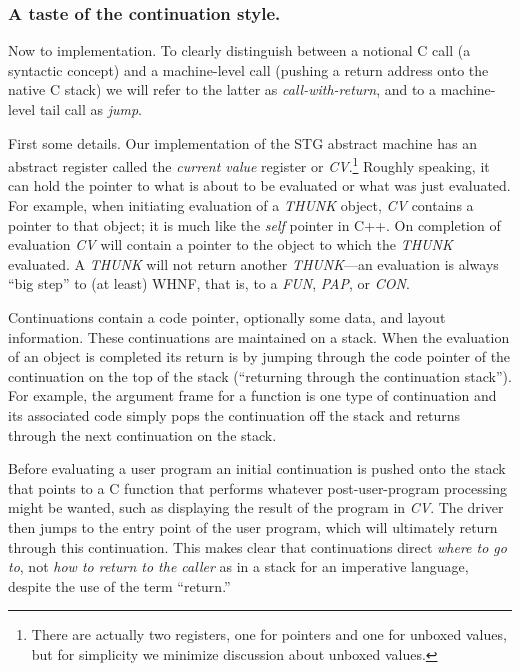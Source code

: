 \documentclass{llncs}
\begin{document}
\subsubsection{A taste of the continuation style.}
Now to implementation.  To clearly distinguish between a notional C call (a
syntactic concept) and a machine-level call (pushing a return address onto the
native C stack) we will refer to the latter as \emph{call-with-return}, and to
a machine-level tail call as \emph{jump}.

First some details.  Our implementation of the STG abstract machine has an
abstract register called the \emph{current value} register or
\emph{CV}.\footnote{There are actually two registers, one for pointers and
  one for unboxed values, but for simplicity we minimize discussion about
  unboxed values.}  Roughly speaking, it can hold the pointer to what is about
to be evaluated or what was just evaluated.  For example, when initiating
evaluation of a \emph{THUNK} object, \emph{CV} contains a pointer to that
object; it is much like the \emph{self} pointer in C++.  On completion of
evaluation \emph{CV} will contain a pointer to the object to which the
\emph{THUNK} evaluated.  A \emph{THUNK} will not return another
\emph{THUNK}---an evaluation is always ``big step'' to (at least) WHNF, that
is, to a \emph{FUN}, \emph{PAP}, or \emph{CON}.

Continuations contain a code pointer, optionally some data, and layout
information.  These continuations are maintained on a stack.  When the
evaluation of an object is completed its return is by jumping through the code
pointer of the continuation on the top of the stack (``returning through the
continuation stack'').  For example, the argument frame for a function is one
type of continuation and its associated code simply pops the continuation off
the stack and returns through the next continuation on the stack.

Before evaluating a user program an initial continuation is pushed onto
the stack that points to a C function that performs whatever post-user-program
processing might be wanted, such as displaying the result of the program in
\emph{CV}\@.  The driver then jumps to the entry point of the user program,
which will ultimately return through this continuation.  This makes clear
that continuations direct \emph{where to go to}, not \emph{how to return
to the caller} as in a stack for an imperative language, despite the use of
the term ``return.''
\end{document}
